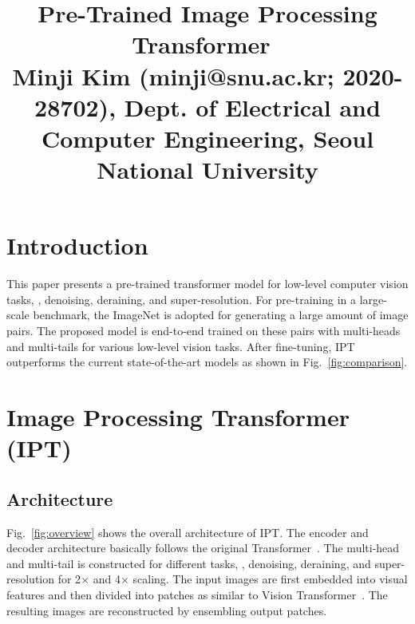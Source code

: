 \documentclass[10pt,twocolumn,letterpaper]{article}
\begin{document}
\title{Pre-Trained Image Processing Transformer~\cite{ipt} \\ {\rm {\normalsize Minji Kim (minji@snu.ac.kr; 2020-28702), Dept. of Electrical and Computer Engineering, Seoul National University}}}   %

\maketitle
\thispagestyle{empty}


\section{Introduction}
This paper presents a pre-trained transformer model for low-level computer vision tasks, \eg, denoising, deraining, and super-resolution.
For pre-training in a large-scale benchmark, the ImageNet is adopted for generating a large amount of image pairs.
The proposed model is end-to-end trained on these pairs with multi-heads and multi-tails for various low-level vision tasks.
After fine-tuning, IPT outperforms the current state-of-the-art models as shown in Fig.~\ref{fig:comparison}.



\section{Image Processing Transformer (IPT)}

\subsection{Architecture}
Fig.~\ref{fig:overview} shows the overall architecture of IPT.
The encoder and decoder architecture basically follows the original Transformer~\cite{transformer}.
The multi-head and multi-tail is constructed for different tasks, \ie, denoising, deraining, and super-resolution for 2$\times$ and 4$\times$ scaling.
The input images are first embedded into visual features and then divided into patches as similar to Vision Transformer~\cite{vit}.
The resulting images are reconstructed by ensembling output patches.
\end{document}

